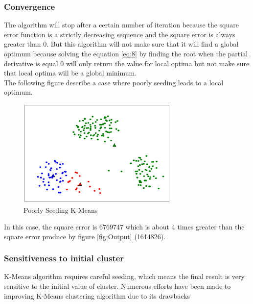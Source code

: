\documentclass[conference]{IEEEtran}
\begin{document}
	\subsubsection{Convergence}
	\indent The algorithm will stop after a certain number of iteration because the square error function is a strictly decreasing sequence and the square error is always greater than 0. But this algorithm will not make sure that it will find a global optimum because solving the equation \ref{eq:8} by finding the root when the partial derivative is equal 0 will only return the value for local optima but not make sure that local optima will be a global minimum. \\
	\indent The following figure describe a case where poorly seeding leads to a local optimum.
\begin{figure}[H]
    \centering
    \includegraphics[width=8cm]{fig4}
    \caption{Poorly Seeding K-Means}
    \label{fig:fig4}
\end{figure}
\indent
	In this case, the square error is 6769747 which is about 4 times greater than the square error produce by figure \ref{fig:Output} (1614826).	
	\subsubsection{Sensitiveness to initial cluster}
	\indent K-Means algorithm requires careful seeding, which means the final result is very sensitive to the initial value of cluster. Numerous efforts have been made to improving K-Means clustering algorithm due to its drawbacks ~\cite{2}
\end{document}
